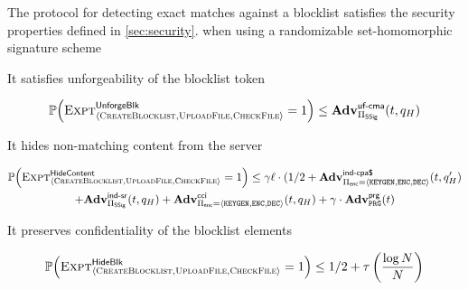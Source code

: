 \begin{theorem}
	
	The protocol \protocolFM for detecting exact matches against a blocklist satisfies the security properties defined in \ref{sec:security}.
when using a randomizable set-homomorphic signature scheme \ourSigSchemeDefn 
	

	\enumListStart
	
	\item It satisfies unforgeability of the blocklist token 
	\begin{small}
	\begin{gather*}
    \mathbb{P}\mathopen{}\left({\textsc{Expt}^{\mathsf{UnforgeBlk}}_{\langle \textsc{CreateBlocklist}, \textsc{UploadFile}, \textsc{CheckFile} \rangle} = 1}\right)\mathclose{} \le \mathbf{Adv}^{\scriptsize\textsf{uf-cma}}_{\Pi_{\mathsf{SSig}} }(t, q_H)
\end{gather*}
	\end{small}
	
	\item It hides non-matching content from the server 
	
	\begin{small}
					\begin{gather*}
			\prob{\hidingContentExp = 1} \le \numProjections \genericVecLen \cdot (1/2 + \Advantage{\indcpaRandLabel}{\encryptionSchemeDefn}(\timeBound, 
		\oracleQueries') \\  + \indsrAdv +  \Advantage{\cciLabel}{\encryptionSchemeDefn}(\timeBound, \oracleQueries)  + \numProjections \cdot \Advantage{\prgLabel}{\prg}(\timeBound)
		\end{gather*}
		\end{small}
	
	\item It preserves confidentiality of the blocklist elements
	
	\begin{small}
				\begin{gather*}
				\mathbb{P}\mathopen{}\left({\textsc{Expt}^{\mathsf{HideBlk}}_{\langle \textsc{CreateBlocklist}, \textsc{UploadFile}, \textsc{CheckFile} \rangle} = 1}\right)\mathclose{} \le 1/2 + \tau \left(\frac{\log N}{N}\right)
			\end{gather*}
		\end{small}
	
	\enumListEnd  
\end{theorem}

